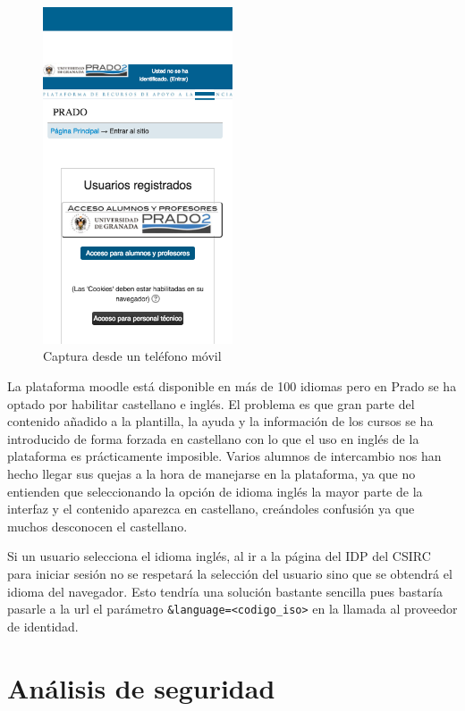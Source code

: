 \begin{figure}[H]
\centering
\includegraphics[width=0.5\textwidth]{../screenshots/capturamovil2}
\caption{Captura desde un teléfono móvil}
\label{fig:capturamovil2}
\end{figure}

\bigskip
La plataforma moodle está disponible en más de 100 idiomas pero en Prado se ha optado por habilitar castellano e inglés. El problema es que gran parte del contenido añadido a la plantilla, la ayuda y la información de los cursos se ha introducido de forma forzada en castellano con lo que el uso en inglés de la plataforma es prácticamente imposible. Varios alumnos de intercambio nos han hecho llegar sus quejas a la hora de manejarse en la plataforma, ya que no entienden que seleccionando la opción de idioma inglés la mayor parte de la interfaz y el contenido aparezca en castellano, creándoles confusión ya que muchos desconocen el castellano.

\bigskip
Si un usuario selecciona el idioma inglés, al ir a la página del IDP del CSIRC para iniciar sesión no se respetará la selección del usuario sino que se obtendrá el idioma del navegador. Esto tendría una solución bastante sencilla pues bastaría pasarle a la url el parámetro \texttt{\&language=<codigo\_iso>} en la llamada al proveedor de identidad.


\section{Análisis de seguridad}

